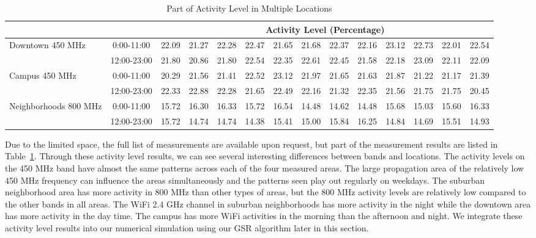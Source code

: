 \begin{table}
\begin{tabular}{|l|c|c|c|c|c|c|c|c|c|c|c|c|c|}
&& \multicolumn{12}{c|}{Activity Level (Percentage)}  \\
\hline
\multirow{2}{*}{Downtown 450 MHz}	
&0:00-11:00 &  22.09 &  21.27 &  22.28 &  22.47 &  21.65 &  21.68&  22.37 &  22.16&  23.12 &  22.73&  22.01 &  22.54 \\ 	
\cline{2-14}	
&12:00-23:00&  21.80 &  20.86 &  21.80 &  22.54 &  22.35 &  22.61&  22.45 &  21.58&  22.18 &  23.09&  22.11 &  22.09 \\ 	
\hline
\multirow{2}{*}{Campus 450 MHz}	
&0:00-11:00 &  20.29 &  21.56 &  21.41 &  22.52 &  23.12 &  21.97&  21.65 &  21.63&  21.87 &  21.22&  21.17 &  21.39 \\ 	
\cline{2-14}	
&12:00-23:00&  22.33 &  22.88 &  22.28 &  21.65 &  22.49 &  22.16&  21.32 &  22.35&  21.56 &  21.75&  21.75 &  20.45 \\ 	
\hline
\multirow{2}{*}{Neighborhoods 800 MHz}	
&0:00-11:00 &  15.72 &  16.30 &  16.33 &  15.72 &  16.54 &  14.48&  14.62 &  14.48&  15.68 &  15.03&  15.60 &  16.33 \\ 	
\cline{2-14}	
&12:00-23:00&  15.72 &  14.74 &  14.74 &  14.38 &  15.41 &  15.00&  15.84 &  16.25&  14.84 &  14.69&  15.51 &  14.93 \\ 	
\hline	
\end{tabular}    
\caption{Part of Activity Level in Multiple Locations} %
\label{tab:activitymeasurement}    
\vspace{0.3in}
\end{table}    


Due to the limited space, the full list of measurements are available upon request, but part of the measurement results are listed in Table~\ref{tab:activitymeasurement}.
Through these activity level results, we can see several interesting differences between bands and locations.
The activity levels on the 450 MHz band have almost the same patterns across each of the four measured areas. 
The large propagation area of the relatively low 450 MHz frequency can influence the areas simultaneously and the patterns seen play out regularly on weekdays.
The suburban neighborhood area has more activity in 800 MHz than other types of areas, but the 800 MHz activity levels are relatively low compared to the other bands in all areas.
The WiFi 2.4 GHz channel in suburban neighborhoods has more activity in the night while the downtown area has more activity in the day time.
The campus has more WiFi activities in the morning than the afternoon and night. 
We integrate these activity level results into our numerical simulation using our GSR algorithm later in this section.


